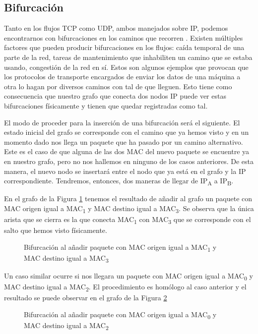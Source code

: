 \documentclass[twoside, 12pt]{epstfg}
\begin{document}
\subsection{Bifurcación}
Tanto en los flujos TCP como UDP, ambos manejados sobre IP, podemos encontrarnos con bifurcaciones en los caminos que recorren \cite{Priya}. Existen múltiples factores que pueden producir bifurcaciones en los flujos: caída temporal de una parte de la red, tareas de mantenimiento que inhabiliten un camino que se estaba usando, congestión de la red en sí. Estos son algunos ejemplos que provocan que los protocolos de transporte encargados de enviar los datos de una máquina a otra lo hagan por diversos caminos con tal de que lleguen. Esto tiene como consecuencia que nuestro grafo que conecta dos nodos IP puede ver estas bifurcaciones físicamente y tienen que quedar registradas como tal.

El modo de proceder para la inserción de una bifurcación será el siguiente. El estado inicial del grafo se corresponde con el camino que ya hemos visto y en un momento dado nos llega un paquete que ha pasado por un camino alternativo. Este es el caso de que alguna de las dos MAC del nuevo paquete se encuentre ya en nuestro grafo, pero no nos hallemos en ninguno de los casos anteriores. De esta manera, el nuevo nodo se insertará entre el nodo que ya está en el grafo y la IP correspondiente. Tendremos, entonces, dos maneras de llegar de IP\textsubscript{A} a IP\textsubscript{B}.

En el grafo de la Figura \ref{fig:Analisis:Bifurcation1} tenemos el resultado de añadir al grafo un paquete con MAC origen igual a MAC\textsubscript{1} y MAC destino igual a MAC\textsubscript{3}. Se observa que la única arista que se cierra es la que conecta MAC\textsubscript{1} con MAC\textsubscript{3} que se corresponde con el salto que hemos visto físicamente.
\begin{figure}[H]
\centering

\caption[Ejemplo de bifurcación 1]{Bifurcación al añadir paquete con MAC origen igual a MAC\textsubscript{1} y MAC destino igual a MAC\textsubscript{3}}
\label{fig:Analisis:Bifurcation1}
\end{figure}

Un caso similar ocurre si nos llegara un paquete con MAC origen igual a MAC\textsubscript{0} y MAC destino igual a MAC\textsubscript{2}. El procedimiento es homólogo al caso anterior y el resultado se puede observar en el grafo de la Figura \ref{fig:Analisis:Bifurcation2}
\begin{figure}[H]
\centering

\caption[Ejemplo de bifurcación 2]{Bifurcación al añadir paquete con MAC origen igual a MAC\textsubscript{0} y MAC destino igual a MAC\textsubscript{2}}
\label{fig:Analisis:Bifurcation2}
\end{figure}
\end{document}
